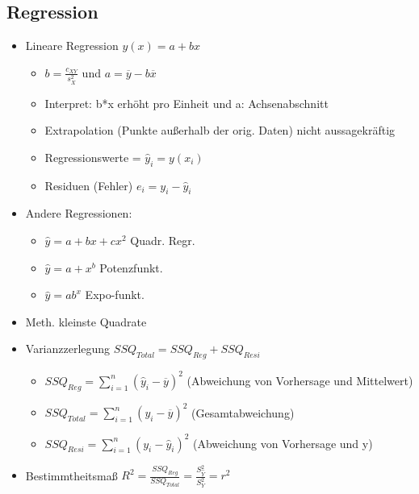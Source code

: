 \documentclass[a4paper]{article}
\begin{document}
\begin{landscape}
\begin{multicols}{4}
  




    \section{Regression}

    \begin{itemize}[noitemsep,nolistsep,leftmargin=*]
        \item Lineare Regression $y(x) = a +bx$
        \begin{itemize}[noitemsep,nolistsep,leftmargin=*]
            \item $b = \frac{c_{XY}}{s_X^2}$ und $a = \overline{y} - b\overline{x}$
            \item Interpret: b*x erhöht pro Einheit und a: Achsenabschnitt
            \item Extrapolation (Punkte außerhalb der orig. Daten) nicht aussagekräftig
            \item Regressionswerte = $\widehat{y}_i = y(x_i)$
            \item Residuen (Fehler) $e_i = y_i - \widehat{y}_i$
        \end{itemize}
        \item Andere Regressionen:
        \begin{itemize}[noitemsep,nolistsep,leftmargin=*]
            \item $\hat{y} =  a+bx+cx^2$ Quadr. Regr.
            \item $\hat{y} =  a+x^b$ Potenzfunkt.
            \item $\hat{y} =  ab^x$ Expo-funkt.
        \end{itemize}
        \item Meth. kleinste Quadrate
        \item Varianzzerlegung $SSQ_{Total} = SSQ_{Reg} + SSQ_{Resi}$
        \begin{itemize}[noitemsep,nolistsep,leftmargin=*]
            \item $SSQ_{Reg} = \sum^n_{i=1} (\hat{y}_i-\overline{y})^2$ (Abweichung von Vorhersage und Mittelwert)
            \item $SSQ_{Total} = \sum^n_{i=1} (y_i-\overline{y})^2$ (Gesamtabweichung)
            \item $SSQ_{Resi} = \sum^n_{i=1} (y_i-\hat{y}_i)^2$ (Abweichung von Vorhersage und y)
        \end{itemize}
        \item Bestimmtheitsmaß $R^2 = \frac{SSQ_{Reg}}{SSQ_{Total}} = \frac{S^2_{\hat{Y}}}{S^2_Y} = r^2$

\end{itemize}
\end{multicols}
\end{landscape}
\end{document}
